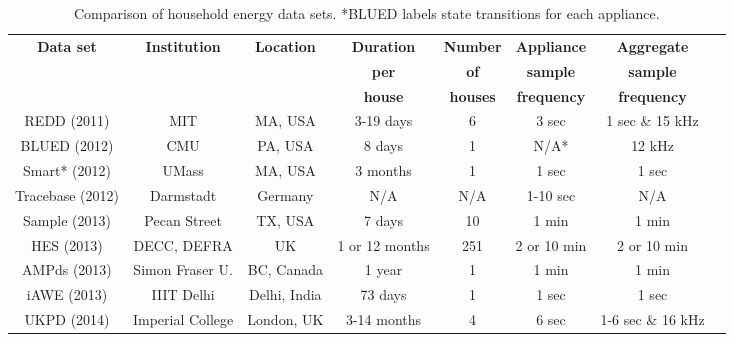 \documentclass{sig-alternate}
\begin{document}
\begin{table}[]
  \centering
  \begin{tabular}{c c c c c c c c}
    \hline
    \bf Data set & \bf Institution & \bf Location & \bf Duration & \bf Number & \bf Appliance & \bf Aggregate\\
    \bf  & \bf  & \bf  & \bf per  & \bf of & \bf sample & \bf sample\\
    \bf  & \bf  & \bf  & \bf house & \bf houses & \bf frequency & \bf frequency \\
    \hline
    REDD (2011) & MIT & MA, USA & 3-19 days & 6 & 3 sec & 1 sec \& 15 kHz\\
    BLUED (2012) & CMU & PA, USA & 8 days & 1 & N/A* & 12 kHz\\
    Smart* (2012) & UMass & MA, USA & 3 months & 1 & 1 sec & 1 sec\\
    Tracebase (2012) & Darmstadt & Germany & N/A & N/A & 1-10 sec & N/A\\
    Sample (2013) & Pecan Street & TX, USA & 7 days & 10 & 1 min & 1 min\\
    HES (2013) & DECC, DEFRA & UK & 1 or 12 months & 251 & 2 or 10 min
    & 2 or 10 min\\
    AMPds (2013) & Simon Fraser U. & BC, Canada & 1 year & 1 & 1 min & 1 min\\
    iAWE (2013) & IIIT Delhi & Delhi, India & 73 days & 1 & 1 sec & 1 sec\\
    UKPD (2014) & Imperial College & London, UK & 3-14 months & 4 & 6 sec & 1-6 sec \& 16 kHz\\
    \hline
  \end{tabular}
  \caption{Comparison of household energy data sets. *BLUED labels state transitions for each appliance.}
  \label{table:datasets}
\end{table}
\end{document}

